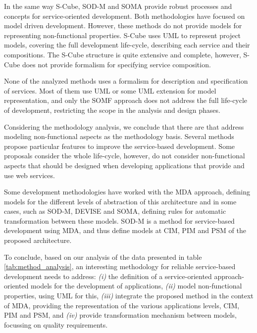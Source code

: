 In the same way S-Cube, SOD-M and SOMA provide robust processes
and concepts for service-oriented development. Both methodologies have focused on
model driven development. However, these methods do not provide models for
representing  non-functional properties. S-Cube uses UML to represent project
models, covering the full development life-cycle, describing each service and their compositions. The 
S-Cube structure is quite extensive and complete, however, S-Cube does
not provide formalism for specifying service composition.     

None of the analyzed methods uses a formalism for 
description and specification of services. Most of them use UML or some UML extension
for model representation, and only the SOMF approach does not address the full
life-cycle of development, restricting the scope in the analysis and design
phases.

Considering the methodology analysis, we conclude that there are
 that address modeling non-functional aspects as
the methodology basis. Several methods propose particular features to improve the service-based
development. Some proposals consider the whole life-cycle, however, do not
consider non-functional aspects that should be designed when
developing applications that provide and use web services.

Some development methodologies have worked
with the MDA approach, defining models for the different levels of abstraction
of this architecture and in some cases, such as SOD-M, DEVISE and SOMA, defining
rules for automatic transformation between these models. SOD-M is a method
for service-based development using MDA, and thus define models at CIM, PIM and
PSM of the proposed architecture. 



To conclude, based on our analysis of the data presented in table
\ref{tab:method_analysis}, an interesting methodology for reliable service-based
development needs to address: \textit{(i)} the definition of a service-oriented
approach-oriented models for the development of applications, \textit{(ii)}
model non-functional properties, using UML for this, \textit{(iii)}
integrate the proposed method in the context of MDA, providing
the representation of the various applications levels, CIM, PIM and PSM, and
\textit{(iv)} provide transformation mechanism between models, focussing on
quality requirements.


